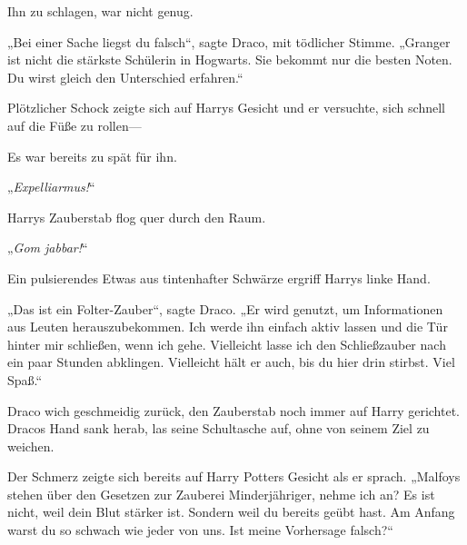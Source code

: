 Ihn zu schlagen, war nicht genug.

„Bei einer Sache liegst du falsch“, sagte Draco, mit tödlicher Stimme. „Granger ist nicht die stärkste Schülerin in Hogwarts. Sie bekommt nur die besten Noten. Du wirst gleich den Unterschied erfahren.“

Plötzlicher Schock zeigte sich auf Harrys Gesicht und er versuchte, sich schnell auf die Füße zu rollen—

Es war bereits zu spät für ihn.

„\emph{Expelliarmus!}“

Harrys Zauberstab flog quer durch den Raum.

„\emph{Gom jabbar!}“

Ein pulsierendes Etwas aus tintenhafter Schwärze ergriff Harrys linke Hand.

„Das ist ein Folter-Zauber“, sagte Draco. „Er wird genutzt, um Informationen aus Leuten herauszubekommen. Ich werde ihn einfach aktiv lassen und die Tür hinter mir schließen, wenn ich gehe. Vielleicht lasse ich den Schließzauber nach ein paar Stunden abklingen. Vielleicht hält er auch, bis du hier drin stirbst. Viel Spaß.“

Draco wich geschmeidig zurück, den Zauberstab noch immer auf Harry gerichtet. Dracos Hand sank herab, las seine Schultasche auf, ohne von seinem Ziel zu weichen.

Der Schmerz zeigte sich bereits auf Harry Potters Gesicht als er sprach. „Malfoys stehen über den Gesetzen zur Zauberei Minderjähriger, nehme ich an? Es ist nicht, weil dein Blut stärker ist. Sondern weil du bereits geübt hast. Am Anfang warst du so schwach wie jeder von uns. Ist meine Vorhersage falsch?“

